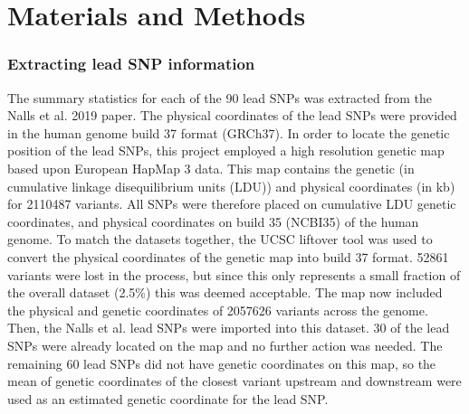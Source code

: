 \documentclass{article}
\begin{document}
\section{Materials and Methods}
\subsubsection{Extracting lead SNP information}
\label{subsubsec:SNPs}
The summary statistics for each of the 90 lead SNPs was extracted from the Nalls et al. 2019 paper\cite{Nalls2019IdentificationStudies}. The physical coordinates of the lead SNPs were provided in the human genome build 37 format (GRCh37). In order to locate the genetic position of the lead SNPs, this project employed a high resolution genetic map\cite{Maniatis2004PositionalDisequilibrium.} based upon European HapMap 3 data. This map contains the genetic (in cumulative linkage disequilibrium units (LDU)) and physical coordinates (in kb) for 2110487 variants. All SNPs were therefore placed on cumulative LDU genetic coordinates, and physical coordinates on build 35 (NCBI35) of the human genome. To match the datasets together, the UCSC liftover tool\cite{Hinrichs2006The2006.} was used to convert the physical coordinates of the genetic map into build 37 format. 52861 variants were lost in the process, but since this only represents a small fraction of the overall dataset (2.5\%) this was deemed acceptable. The map now included the physical and genetic coordinates of 2057626 variants across the genome. Then, the Nalls et al.\cite{Nalls2019IdentificationStudies} lead SNPs were imported into this dataset. 30 of the lead SNPs were already located on the map and no further action was needed. The remaining 60 lead SNPs did not have genetic coordinates on this map, so the mean of genetic coordinates of the closest variant upstream and downstream were used as an estimated genetic coordinate for the lead SNP.
\end{document}
